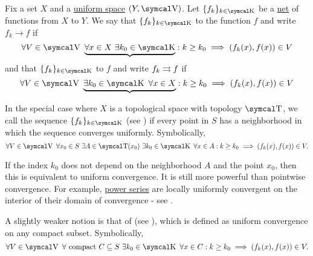\begin{Definition}\label{def:function_net_convergence}
  Fix a set \( X \) and a \hyperref[def:uniform_space]{uniform space} \( (Y, \CV) \). Let \( \{ f_k \}_{k \in \CK} \) be a \hyperref[def:topological_net]{net} of functions from \( X \) to \( Y \). We say that \( \{ f_k \}_{k \in \CK} \)  to the function \( f \) and write \( f_k \to f \) if
  \begin{equation}\label{def:function_net_convergence/pointwise}
    \forall V \in \CV \ \underbrace{\forall x \in X \ \exists k_0 \in \CK} : k \geq k_0 \implies (f_k(x), f(x)) \in V
  \end{equation}
  and that \( \{ f_k \}_{k \in \CK} \)  to \( f \) and write \( f_k \rightrightarrows f \) if
  \begin{equation}\label{def:function_net_convergence/uniform}
    \forall V \in \CV \ \underbrace{\exists k_0 \in \CK \ \forall x \in X} : k \geq k_0 \implies (f_k(x), f(x)) \in V
  \end{equation}

  In the special case where \( X \) is a topological space with topology \( \CT \), we call the sequence \( \{ f_k \}_{k \in \CK} \)  (see \cite{ProofWiki:locally_uniform_convergence}) if every point in \( S \) has a neighborhood in which the sequence converges uniformly. Symbolically,
  \begin{equation}\label{def:function_net_convergence/locally_uniform}
    \forall V \in \CV \ \forall x_0 \in S \ \exists A \in \CT(x_0) \ \exists k_0 \in \CK \ \forall x \in A : k \geq k_0 \implies (f_k(x), f(x)) \in V.
  \end{equation}

  If the index \( k_0 \) does not depend on the neighborhood \( A \) and the point \( x_0 \), then this is equivalent to uniform convergence. It is still more powerful than pointwise convergence. For example, \hyperref[def:convergent_power_series]{power series} are locally uniformly convergent on the interior of their domain of convergence - see .

  A slightly weaker notion is that of  (see \cite{ProofWiki:compact_convergence}), which is defined as uniform convergence on any compact subset. Symbolically,
  \begin{equation}\label{def:function_net_convergence/compact}
    \forall V \in \CV \ \forall \text{ compact } C \subseteq S \ \exists k_0 \in \CK \ \forall x \in C : k \geq k_0 \implies (f_k(x), f(x)) \in V.
  \end{equation}
\end{Definition}

